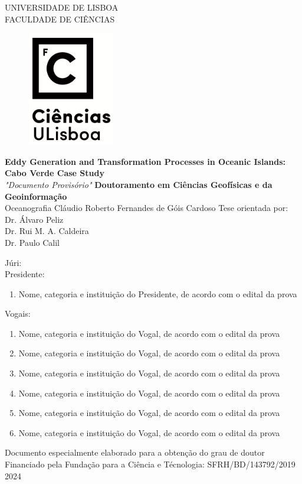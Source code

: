 \begin{titlepage}
	\centering
	UNIVERSIDADE DE LISBOA\\
	FACULDADE DE CIÊNCIAS\\
	\vfill
	\begin{figure}[h]
		\centering
		\includegraphics[width = 3.84cm,height = 5.00cm]{images/logo_vertical.png}
	\end{figure}
	
	\vfill
	\fontsize{12.2}{14.4}\selectfont \textbf{Eddy Generation and Transformation Processes in Oceanic Islands: Cabo Verde Case Study}\\
	\vfill
	\textit{"Documento Provisório"}
	\vfill
	\textbf{Doutoramento em Ciências Geofísicas e da Geoinformação}\\
	Oceanografia
	\vfill
	Cláudio Roberto Fernandes de Góis Cardoso
	\vfill
	\fontsize{12}{14.4}\selectfont Tese orientada por:\\
	Dr. Álvaro Peliz\\
	Dr. Rui M. A. Caldeira \\
	Dr. Paulo Calil
	\begin{flushleft}
	Júri: \\
	Presidente: 
	\begin{enumerate}
		\item Nome, categoria e instituição do Presidente, de acordo com o edital da prova 
	\end{enumerate}
	Vogais: 
	\begin{enumerate}
		\item Nome, categoria e instituição do Vogal, de acordo com o edital da prova 
		\item Nome, categoria e instituição do Vogal, de acordo com o edital da prova 
		\item Nome, categoria e instituição do Vogal, de acordo com o edital da prova 
		\item Nome, categoria e instituição do Vogal, de acordo com o edital da prova 
		\item Nome, categoria e instituição do Vogal, de acordo com o edital da prova 
		\item Nome, categoria e instituição do Vogal, de acordo com o edital da prova 
	\end{enumerate}	
	\end{flushleft}
	\vfill
	Documento especialmente elaborado para a obtenção do grau de doutor
	\vfill
	Financiado pela Fundação para a Ciência e Técnologia: SFRH/BD/143792/2019
	\vfill
	\fontsize{14}{12}2024\\
\end{titlepage}